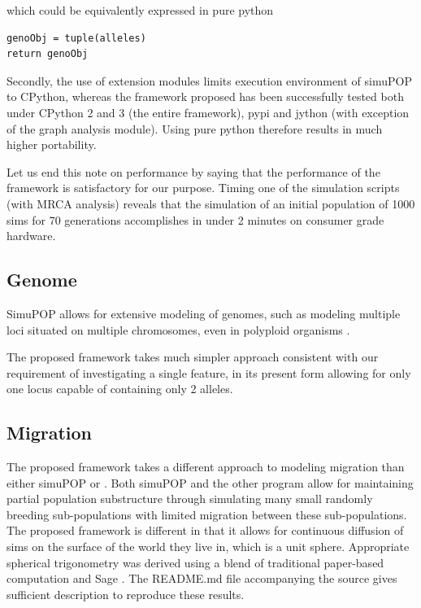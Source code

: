 \documentclass{l4proj}
\begin{document}
which could be equivalently expressed in pure python 

\begin{lstlisting}
genoObj = tuple(alleles)
return genoObj    
\end{lstlisting}

Secondly, the use of extension modules limits execution environment of simuPOP to CPython, whereas the framework proposed has been successfully tested both under CPython 2 and 3 (the entire framework), pypi and jython (with exception of the graph analysis module). Using pure python therefore results in much higher portability.

Let us end this note on performance by saying that the performance of the framework is satisfactory for our purpose. Timing one of the simulation scripts (with MRCA analysis) reveals that the simulation of an initial population of 1000 sims for 70 generations accomplishes in under 2 minutes on consumer grade hardware.

\subsection{Genome}
SimuPOP allows for extensive modeling of genomes, such as modeling multiple loci situated on multiple \gls{chromosome}s, even in \gls{polyploid} organisms \parencite{simuPOP16}.

The proposed framework takes much simpler approach consistent with our requirement of investigating a single feature, in its present form allowing for only one \gls{locus} capable of containing only 2 alleles.

\subsection{Migration}
The proposed framework takes a different approach to modeling migration than either simuPOP or \cite{rohde04}. Both simuPOP and the other program allow for maintaining partial population substructure through simulating many small randomly breeding sub-populations with limited migration between these sub-populations. The proposed framework is different in that it allows for continuous diffusion of sims on the surface of the world they live in, which is a unit sphere. Appropriate spherical trigonometry was derived using a blend of traditional paper-based computation and Sage \parencite{sage14}. The README.md file accompanying the source gives sufficient description to reproduce these results.
\end{document}
